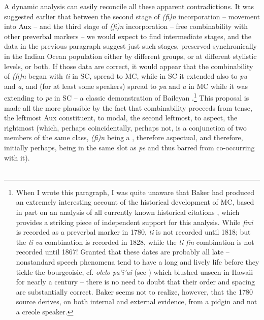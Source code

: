 A dynamic analysis can easily reconcile all these apparent contradictions. It was suggested earlier that between the second stage of \textit{(fi)n} incorporation -- movement into Aux -- and the third stage of \textit{(fi)n} incorporation -- free combinability with other preverbal markers -- we would expect to find intermediate stages, and the data in the previous paragraph suggest just such stages, preserved synchronically in the Indian Ocean population either by different groups, or at different stylistic levels, or both. If those data are correct, it would appear that the combinability of \textit{(fi)n} began with \textit{ti} in SC, spread to MC, while in SC it extended also to \textit{pu} and \textit{a}, and (for at least some speakers) spread to \textit{pu} and \textit{a} in MC while it was extending to \textit{pe} in SC -- a classic demonstration of Baileyan .\footnote{When I wrote this paragraph, I was quite unaware that Baker had produced an extremely interesting account of the historical de\-velopment of MC, based in part on an analysis of all currently known historical citations \citep{Baker1976}, which provides a striking piece of independent support for this analysis. While \textit{fini} is recorded as a pre\-verbal marker in 1780, \textit{ti} is not recorded until 1818; but the \textit{ti va} combination is recorded in 1828, while the \textit{ti fin} combination is not recorded until 1867! Granted that these dates are probably all late -- nonstandard speech phenomena tend to have a long and lively life before they tickle the bourgeoisie, cf. \textit{olelo pa'i'ai} (see ) which blushed unseen in Hawaii for nearly a century -- there is no need to doubt that their order and spacing are substantially correct. Baker seems not to realize, however, that the 1780 source derives, on both internal and external evidence, from a pidgin and not a creole speaker.} This proposal is made all the more plausible by the fact that combinability proceeds from tense, the leftmost Aux constituent, to modal, the second leftmost, to aspect, the rightmost (which, perhaps coincidentally, perhaps
not, is a conjunction of two members of the same class, \textit{(fi)n} being a , therefore aspectual, and therefore, initially perhaps, being in the same slot as \textit{pe} and thus barred from co-occurring with it).\\\\

